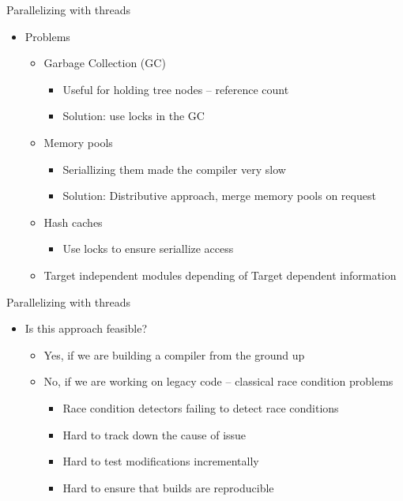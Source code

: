 \begin{frame}{Parallelizing with threads}

\begin{itemize}
    \item Problems
    \begin{itemize}
        \item Garbage Collection (GC)
        \begin{itemize}
            \item Useful for holding tree nodes -- reference count
            \item Solution: use locks in the GC
        \end{itemize}
        \item Memory pools
        \begin{itemize}
            \item Seriallizing them made the compiler very slow
            \item Solution: Distributive approach, merge memory pools on request
        \end{itemize}
        \item Hash caches
        \begin{itemize}
            \item Use locks to ensure seriallize access
        \end{itemize}
        \item Target independent modules depending of Target dependent information
    \end{itemize}
\end{itemize}
\end{frame}


\begin{frame}{Parallelizing with threads}

\begin{itemize}
    \item Is this approach feasible?
    \begin{itemize}
        \item Yes, if we are building a compiler from the ground up
        \item No, if we are working on legacy code -- classical race condition problems
        \begin{itemize}
            \item Race condition detectors failing to detect race conditions
            \item Hard to track down the cause of issue
            \item Hard to test modifications incrementally
            \item Hard to ensure that builds are reproducible
        \end{itemize}
    \end{itemize}
\end{itemize}
\end{frame}

